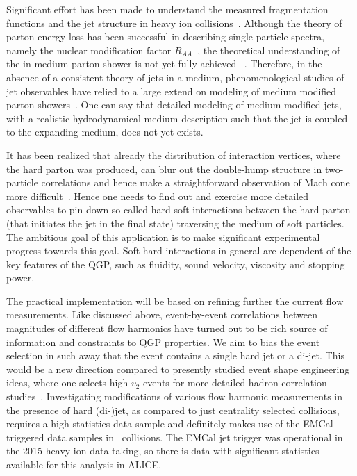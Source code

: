 Significant effort has been made to understand the measured fragmentation functions and the jet structure in heavy ion collisions~\cite{Chatrchyan:2011sx,Chatrchyan:2013kwa,Chatrchyan:2014ava,Adam:2015ewa,Khachatryan:2016erx}. Although the theory of parton energy loss has been successful in describing single particle spectra, namely the nuclear modification factor $R_{AA}$~\cite{Aamodt:2010jd}, the theoretical understanding of the in-medium parton shower is not yet fully achieved ~\cite{PhysRevLett.106.122002}. Therefore, in the absence of a consistent theory of jets in a medium, phenomenological studies of jet observables have relied to a large extend on modeling of medium modified parton showers~\cite{Armesto:2008qh,Renk:2010zx}. One can say that detailed modeling of medium modified jets, with a realistic hydrodynamical medium description such that the jet is coupled to the expanding medium, does not yet exists.

It has been realized that already the distribution of interaction vertices, where the hard parton was produced, can blur out the double-hump structure in two-particle correlations and hence make a straightforward observation of Mach cone more difficult~\cite{Tachibana:2015qxa}. Hence one needs to find out and exercise more detailed observables to pin down so called hard-soft interactions between the hard parton (that initiates the jet in the final state) traversing the medium of soft particles. The ambitious goal of this application is to make significant experimental progress towards this goal. Soft-hard interactions in general are dependent of the key features of the QGP, such as fluidity, sound velocity, viscosity and stopping power.

The practical implementation will be based on refining further the current flow measurements. Like discussed above, event-by-event correlations between magnitudes of different flow harmonics have turned out to be rich source of information and constraints to QGP properties. We aim to bias the event selection in such away that the event contains a single hard jet or a di-jet. This would be a new direction compared to presently studied event shape engineering ideas, where one selects high-$v_2$  events for more detailed hadron correlation studies~\cite{ALICE:2016kpq}. Investigating modifications of various flow harmonic measurements in the presence of hard (di-)jet, as compared to just centrality selected collisions, requires a high statistics data sample and definitely makes use of the EMCal triggered data samples in \pbpb\ collisions. The EMCal jet trigger was operational in the 2015 heavy ion data taking, so there is data with significant statistics available for this analysis in ALICE.

